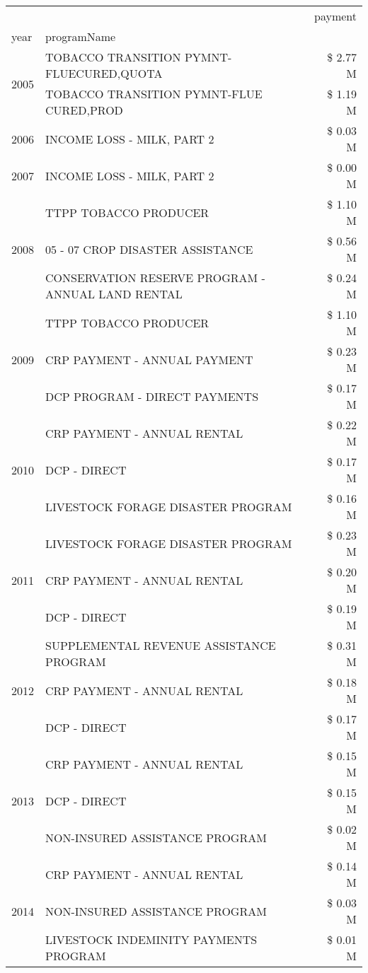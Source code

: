 \begin{tabular}{llr}
\toprule
 &  & payment \\
year & programName &  \\
\midrule
\multirow[t]{2}{*}{2005} & TOBACCO TRANSITION PYMNT-FLUECURED,QUOTA & \$ 2.77 M \\
 & TOBACCO TRANSITION PYMNT-FLUE CURED,PROD & \$ 1.19 M \\
\cline{1-3}
2006 & INCOME LOSS - MILK, PART 2 & \$ 0.03 M \\
\cline{1-3}
2007 & INCOME LOSS - MILK, PART 2 & \$ 0.00 M \\
\cline{1-3}
\multirow[t]{3}{*}{2008} & TTPP TOBACCO PRODUCER & \$ 1.10 M \\
 & 05 - 07 CROP DISASTER ASSISTANCE & \$ 0.56 M \\
 & CONSERVATION RESERVE PROGRAM - ANNUAL LAND RENTAL & \$ 0.24 M \\
\cline{1-3}
\multirow[t]{3}{*}{2009} & TTPP TOBACCO PRODUCER & \$ 1.10 M \\
 & CRP PAYMENT - ANNUAL PAYMENT & \$ 0.23 M \\
 & DCP PROGRAM - DIRECT PAYMENTS & \$ 0.17 M \\
\cline{1-3}
\multirow[t]{3}{*}{2010} & CRP PAYMENT - ANNUAL RENTAL & \$ 0.22 M \\
 & DCP - DIRECT & \$ 0.17 M \\
 & LIVESTOCK FORAGE DISASTER PROGRAM & \$ 0.16 M \\
\cline{1-3}
\multirow[t]{3}{*}{2011} & LIVESTOCK FORAGE DISASTER PROGRAM & \$ 0.23 M \\
 & CRP PAYMENT - ANNUAL RENTAL & \$ 0.20 M \\
 & DCP - DIRECT & \$ 0.19 M \\
\cline{1-3}
\multirow[t]{3}{*}{2012} & SUPPLEMENTAL REVENUE ASSISTANCE PROGRAM & \$ 0.31 M \\
 & CRP PAYMENT - ANNUAL RENTAL & \$ 0.18 M \\
 & DCP - DIRECT & \$ 0.17 M \\
\cline{1-3}
\multirow[t]{3}{*}{2013} & CRP PAYMENT - ANNUAL RENTAL & \$ 0.15 M \\
 & DCP - DIRECT & \$ 0.15 M \\
 & NON-INSURED ASSISTANCE PROGRAM & \$ 0.02 M \\
\cline{1-3}
\multirow[t]{3}{*}{2014} & CRP PAYMENT - ANNUAL RENTAL & \$ 0.14 M \\
 & NON-INSURED ASSISTANCE PROGRAM & \$ 0.03 M \\
 & LIVESTOCK INDEMINITY PAYMENTS PROGRAM & \$ 0.01 M \\

\end{tabular}
